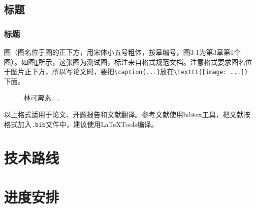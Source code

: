 \documentclass{ecustbachelorthesis}
\begin{document}
\section{标题}
\subsection{标题}
\begin{subtext}
图（图名位于图的正下方，用宋体小五号粗体，按章编号，图3-1为第3章第1个图）。如图\ref{fig:linc}所示，这张图为测试图，标注来自格式规范文档\cite{ecustjwc}。注意格式要求图名位于图片正下方，所以写论文时，要把\verb$\caption{...}$放在\verb$\texttt{[image: ...]}$下面。
\setlength{\belowcaptionskip}{-10pt}
\vspace{-7pt}
\begin{figure}[!htbp]
  \centering
  \vspace{-5pt}\caption{林可霉素……}
  \label{fig:linc}
\end{figure}

以上格式适用于论文、开题报告和文献翻译。参考文献使用bibtex工具，把文献按格式加入\verb$.bib$文件中，建议使用LaTeXTools编译。
\end{subtext}
\chapter{技术路线}
\chapter{进度安排}


\end{document}
